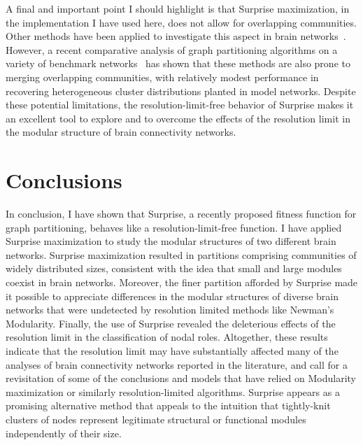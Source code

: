 A final and important point I should highlight is that Surprise maximization, in the implementation I have used here, does not allow for overlapping communities. Other methods have been applied to investigate this aspect in brain networks~\cite{palla2005,ahn2010}. However, a recent comparative analysis of graph partitioning algorithms on a variety of benchmark networks~\cite{lancichinetti2009} has shown that these methods are also prone to merging overlapping communities, with relatively modest performance in recovering heterogeneous cluster distributions planted in model networks.
Despite these potential limitations, the resolution-limit-free behavior of Surprise makes it an excellent tool to explore and to overcome the effects of the resolution limit in the modular structure of brain connectivity networks.


\section{Conclusions}
In conclusion, I have shown that Surprise, a recently proposed fitness function for graph partitioning, behaves like a resolution-limit-free function.
I have applied Surprise maximization to study the modular structures of two different brain networks.
Surprise maximization resulted in partitions comprising communities of widely distributed sizes, consistent with the idea that small and large modules coexist in brain networks.
Moreover, the finer partition afforded by Surprise made it possible to appreciate differences in the modular structures of diverse brain networks that were undetected by resolution limited methods like Newman's Modularity.
Finally, the use of Surprise revealed the deleterious effects of the resolution limit in the classification of nodal roles.
Altogether, these results indicate that the resolution limit may have substantially affected many of the analyses of brain connectivity networks reported in the literature, and call for a revisitation of some of the conclusions and models that have relied on Modularity maximization or similarly resolution-limited algorithms.
Surprise appears as a promising alternative method that appeals to the intuition that tightly-knit clusters of nodes represent legitimate structural or functional modules independently of their size.
